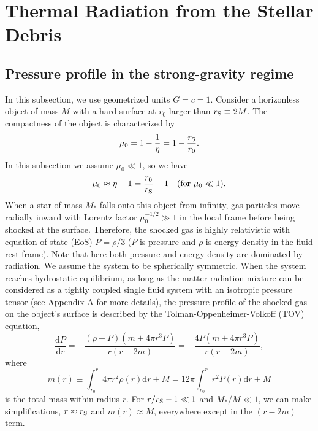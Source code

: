 \documentclass[useAMS,usenatbib]{mn2e}
\def\d{{\mathrm{d}}}
\begin{document}
\section{Thermal Radiation from the Stellar
  Debris}\label{sec:envelope}  
\subsection{Pressure profile in the strong-gravity
  regime}\label{sec:profile} 

In this subsection, we use geometrized units $G = c = 1$. Consider a
horizonless object of mass $M$ with a hard  
surface at $r_0$ larger than $r_{\rm S}\equiv2M$. The
compactness of the object is characterized by
\begin{equation}
\label{eq:mu0}
\mu_0 = 1 - \frac{1}{\eta} =
1 - \frac{r_{\rm S}}{r_0}.
\end{equation} 
In this 
subsection we assume $\mu_0\ll 1$, so we have 
\begin{equation}
\label{eq:mu0approx}
\mu_0 \approx \eta - 1 = \frac{r_0}{r_{\rm S}} - 1
\quad{\rm(for}~\mu_0\ll1).
\end{equation} 
When a star of mass
$M_*$ falls onto this object from infinity, gas particles move radially inward
with Lorentz factor $\mu_0^{-1/2}\gg1$ in the local frame before being
shocked at the 
surface. Therefore, the shocked gas is highly relativistic with
equation of state (EoS) $P = \rho /3$ ($P$ is pressure and $\rho$ is
energy density in the fluid rest frame). Note that here both pressure
and energy density are dominated by radiation. We assume the system to
be spherically symmetric. When the system reaches hydrostatic
equilibrium, as long as the matter-radiation mixture can be considered
as a tightly coupled single fluid system with an isotropic pressure
tensor (see Appendix A for more details), the pressure profile of
the shocked gas on the object's surface is described by the
Tolman-Oppenheimer-Volkoff (TOV) equation,
\begin{equation}
  \label{eq:104}
  \frac{\d P}{\d r} = - \frac{(\rho + P)(m + 4\pi r^3 P)}{r(r - 2m)} =
  - \frac{4P(m + 4\pi r^3 P)}{r(r - 2m)},
\end{equation}
where
\begin{equation}
  \label{eq:109}
  m(r) \equiv \int_{r_0}^r 4\pi r^2 \rho(r) \d r + M= 12\pi \int_{r_0}^r r^2
P(r) \d r + M
\end{equation}
is the total mass within radius $r$. For $r/r_{\rm S} - 1
\ll 1$ and $M_*/M\ll 1$, we can make simplifications, $r\approx r_{\rm
  S}$ and $m(r)\approx M$, everywhere except in the $(r - 2m)$ term.
\end{document}
